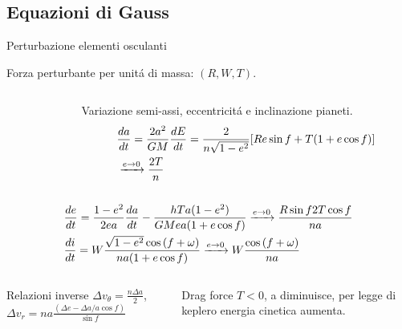 \subsection{Equazioni di Gauss}

\begin{frame}{Perturbazione elementi osculanti}
\begin{block}{Forza perturbante per unit\'a di massa: $(R,W,T)$.}\end{block}
\begin{columns}[T]
\begin{column}{0.2\textwidth}

\end{column}
\begin{column}{0.8\textwidth}
\begin{block}{Variazione semi-assi, eccentricit\'a e inclinazione pianeti.}
\begin{align*}
&\TDy{t}{a}=\frac{2a^2}{GM}\TDy{t}{E}=\frac{2}{n\sqrt{1-e^2}}[Re\sin{f}+T(1+e\cos{f})]\\
&\xrightarrow{e\to0}\frac{2T}{n}
\end{align*}
\end{block}
\end{column}\end{columns}
\begin{align*}
&\TDy{t}{e}=\frac{1-e^2}{2ea}\TDy{t}{a}-\frac{hTa(1-e^2)}{GMea(1+e\cos{f})}\xrightarrow{e\to0}\frac{R\sin{f}2T\cos{f}}{na}\\
&\TDy{t}{i}=W\frac{\sqrt{1-e^2}\cos{(f+\omega)}}{na(1+e\cos{f})}\xrightarrow{e\to0}W\frac{\cos{(f+\omega)}}{na}
\end{align*}
\begin{columns}  \begin{column}{0.55\textwidth}
\begin{block}{Relazioni inverse}
$\Delta v_{\theta}=\frac{n\Delta a}{2}$, $\Delta v_r=na\frac{(\Delta e-\Delta a/a\cos{f})}{\sin{f}}$
\end{block}
\end{column} \begin{column}{0.45\textwidth}
\begin{block}{Drag force}
$T<0$, a diminuisce, per legge di keplero energia cinetica aumenta.
\end{block}
\end{column}\end{columns}
\end{frame}

